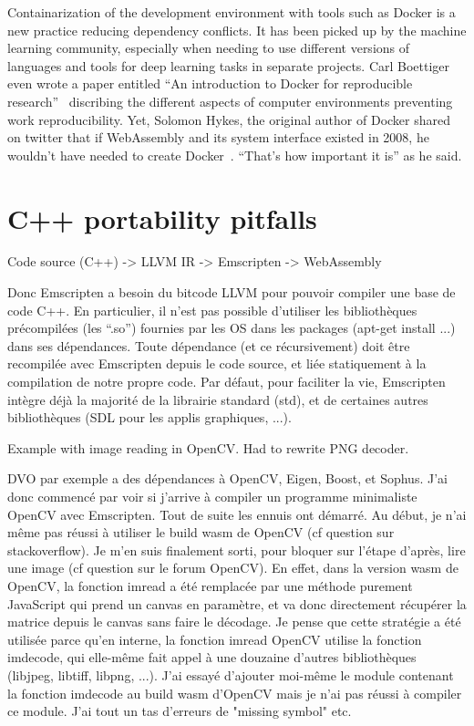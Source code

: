 Containarization of the development environment with tools such as Docker
is a new practice reducing dependency conflicts.
It has been picked up by the machine learning community,
especially when needing to use different versions of languages and tools
for deep learning tasks in separate projects.
Carl Boettiger even wrote a paper entitled
``An introduction to Docker for reproducible research''~\cite{boettiger2015introduction}
discribing the different aspects of computer environments preventing work reproducibility.
Yet, Solomon Hykes, the original author of Docker shared on twitter that
if WebAssembly and its system interface existed in 2008, he wouldn't have
needed to create Docker~\cite{hykes2019twitter}. ``That's how important it is'' as he said.

\section{C++ portability pitfalls}%
\label{sec:cpp_pitfalls}

Code source (C++) -> LLVM IR -> Emscripten -> WebAssembly

Donc Emscripten a besoin du bitcode LLVM pour pouvoir compiler une base de code C++. En particulier, il n’est pas possible d’utiliser les bibliothèques précompilées (les “.so”) fournies par les OS dans les packages (apt-get install ...) dans ses dépendances. Toute dépendance (et ce récursivement) doit être recompilée avec Emscripten depuis le code source, et liée statiquement à la compilation de notre propre code. Par défaut, pour faciliter la vie, Emscripten intègre déjà la majorité de la librairie standard (std), et de certaines autres bibliothèques (SDL pour les applis graphiques, ...).

Example with image reading in OpenCV.
Had to rewrite PNG decoder.


DVO par exemple a des dépendances à OpenCV, Eigen, Boost, et Sophus. J’ai donc commencé par voir si j’arrive à compiler un programme minimaliste OpenCV avec Emscripten. Tout de suite les ennuis ont démarré. Au début, je n’ai même pas réussi à utiliser le build wasm de OpenCV (cf question sur stackoverflow). Je m’en suis finalement sorti, pour bloquer sur l’étape d’après, lire une image (cf question sur le forum OpenCV). En effet, dans la version wasm de OpenCV, la fonction imread a été remplacée par une méthode purement JavaScript qui prend un canvas en paramètre, et va donc directement récupérer la matrice depuis le canvas sans faire le décodage. Je pense que cette stratégie a été utilisée parce qu’en interne, la fonction imread OpenCV utilise la fonction imdecode, qui elle-même fait appel à une douzaine d’autres bibliothèques (libjpeg, libtiff, libpng, ...). J’ai essayé d’ajouter moi-même le module contenant la fonction imdecode au build wasm d’OpenCV mais je n’ai pas réussi à compiler ce module. J’ai tout un tas d’erreurs de "missing symbol" etc.

